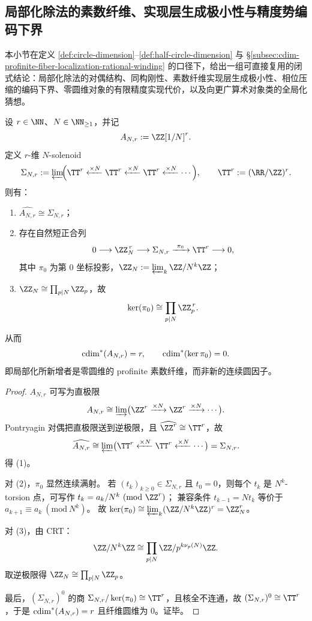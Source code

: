 \subsection{局部化除法的素数纤维、实现层生成极小性与精度势编码下界}\label{subsec:cdim-localized-division-prime-fiber-precision-minimality}
本小节在定义 \ref{def:circle-dimension}--\ref{def:half-circle-dimension} 与 \S\ref{subsec:cdim-profinite-fiber-localization-rational-winding} 的口径下，给出一组可直接复用的闭式结论：局部化除法的对偶结构、同构刚性、素数纤维实现层生成极小性、相位压缩的编码下界、零圆维对象的有限精度实现代价，以及向更广算术对象类的全局化猜想。

\begin{theorem}[局部化除法强制生成素数纤维且不增圆维]\label{thm:cdim-localized-division-prime-fiber-no-growth}
设 \(r\in\NN\)、\(N\in\NN_{\ge 1}\)，并记
\[
A_{N,r}:=\ZZ[1/N]^r.
\]
定义 \(r\)-维 \(N\)-solenoid
\[
\Sigma_{N,r}
:=
\varprojlim\!\Bigl(
\TT^r\xleftarrow{\times N}\TT^r\xleftarrow{\times N}\TT^r\xleftarrow{\times N}\cdots
\Bigr),
\qquad
\TT^r:=(\RR/\ZZ)^r.
\]
则有：
\begin{enumerate}
  \item \(\widehat{A_{N,r}}\cong \Sigma_{N,r}\)；
  \item 存在自然短正合列
  \[
  0\longrightarrow \ZZ_N^{\,r}
  \longrightarrow \Sigma_{N,r}
  \xrightarrow{\ \pi_0\ }
  \TT^r
  \longrightarrow 0,
  \]
  其中 \(\pi_0\) 为第 \(0\) 坐标投影，\(\ZZ_N:=\varprojlim_k \ZZ/N^k\ZZ\)；
  \item \(\ZZ_N\cong\prod_{p\mid N}\ZZ_p\)，故
  \[
  \ker(\pi_0)\cong \prod_{p\mid N}\ZZ_p^{\,r}.
  \]
\end{enumerate}
从而
\[
\operatorname{cdim}^\ast(A_{N,r})=r,\qquad \operatorname{cdim}^\ast(\ker\pi_0)=0.
\]
即局部化所新增者是零圆维的 profinite 素数纤维，而非新的连续圆因子。
\end{theorem}

\begin{proof}
\(A_{N,r}\) 可写为直极限
\[
A_{N,r}\cong \varinjlim\bigl(\ZZ^r\xrightarrow{\times N}\ZZ^r\xrightarrow{\times N}\cdots\bigr).
\]
Pontryagin 对偶把直极限送到逆极限，且 \(\widehat{\ZZ^r}\cong \TT^r\)，故
\[
\widehat{A_{N,r}}
\cong
\varprojlim\bigl(\TT^r\xleftarrow{\times N}\TT^r\xleftarrow{\times N}\cdots\bigr)
=\Sigma_{N,r}.
\]
得 (1)。

对 (2)，\(\pi_0\) 显然连续满射。
若 \((t_k)_{k\ge 0}\in\Sigma_{N,r}\) 且 \(t_0=0\)，则每个 \(t_k\) 是 \(N^k\)-torsion 点，可写作
\(
t_k=a_k/N^k\ (\mathrm{mod}\ \ZZ^r)
\)；
兼容条件 \(t_{k-1}=Nt_k\) 等价于
\(
a_{k+1}\equiv a_k\ (\mathrm{mod}\ N^k)
\)。
故 \(\ker(\pi_0)\cong\varprojlim_k(\ZZ/N^k\ZZ)^r=\ZZ_N^r\)。

对 (3)，由 CRT：
\[
\ZZ/N^k\ZZ
\cong
\prod_{p\mid N}\ZZ/p^{k\nu_p(N)}\ZZ.
\]
取逆极限得 \(\ZZ_N\cong\prod_{p\mid N}\ZZ_p\)。

最后，\((\Sigma_{N,r})^0\) 的商 \(\Sigma_{N,r}/\ker(\pi_0)\cong\TT^r\)，且核全不连通，故 \((\Sigma_{N,r})^0\cong \TT^r\)，于是 \(\operatorname{cdim}^\ast(A_{N,r})=r\) 且纤维圆维为 \(0\)。证毕。
\end{proof}


